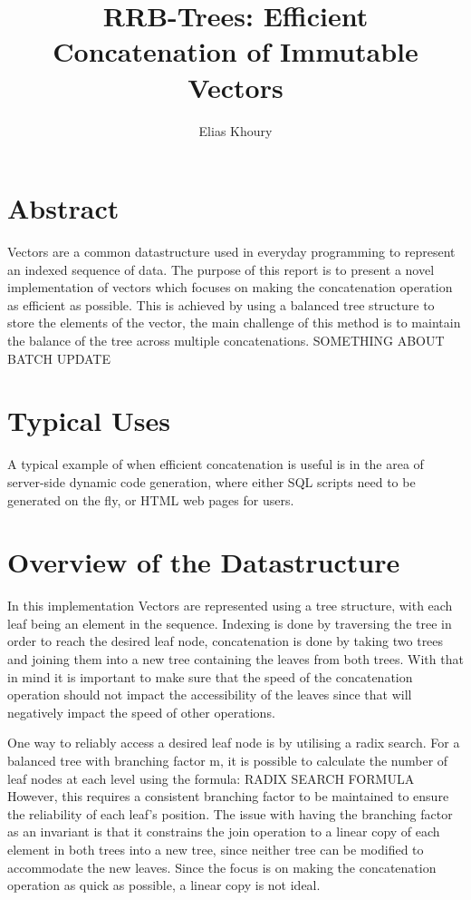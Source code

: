 \documentclass[11pt,a4paper,oneside]{article}
\title {RRB-Trees: Efficient Concatenation of Immutable Vectors}
\author {Elias Khoury}
\begin{document}
\maketitle

\section{Abstract}

Vectors are a common datastructure used in everyday programming to represent an indexed sequence of data. The purpose of this report is to present a novel implementation of vectors which focuses on making the concatenation operation as efficient as possible. This is achieved by using a balanced tree structure to store the elements of the vector, the main challenge of this method is to maintain the balance of the tree across multiple concatenations. SOMETHING ABOUT BATCH UPDATE


\section{Typical Uses}

A typical example of when efficient concatenation is useful is in the area of server-side dynamic code generation, where either SQL scripts need to be generated on the fly, or HTML web pages for users. 


\section{Overview of the Datastructure}

In this implementation Vectors are represented using a tree structure, with each leaf being an element in the sequence. Indexing is done by traversing the tree in order to reach the desired leaf node, concatenation is done by taking two trees and joining them into a new tree containing the leaves from both trees. With that in mind it is important to make sure that the speed of the concatenation operation should not impact the accessibility of the leaves since that will negatively impact the speed of other operations. 

One way to reliably access a desired leaf node is by utilising a radix search. For a balanced tree with branching factor m, it is possible to calculate the number of leaf nodes at each level using the formula:
RADIX SEARCH FORMULA
However, this requires a consistent branching factor to be maintained to ensure the reliability of each leaf's position. The issue with having the branching factor as an invariant is that it constrains the join operation to a linear copy of each element in both trees into a new tree, since neither tree can be modified to accommodate the new leaves. Since the focus is on making the concatenation operation as quick as possible, a linear copy is not ideal.
\end{document}
